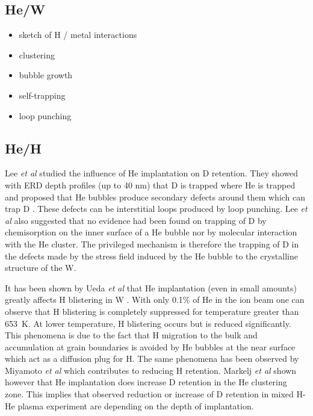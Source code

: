 \subsection{He/W}
\begin{itemize}
    \item sketch of H / metal interactions
    \item clustering
    \item bubble growth
    \item self-trapping
    \item loop punching
\end{itemize}


\subsection{He/H}
Lee \textit{et al} studied the influence of He implantation on D retention.
They showed with ERD depth profiles (up to 40 nm) that D is trapped where He is trapped and proposed that He bubbles produce secondary defects around them which can trap D \cite{lee_hydrogen_2007}.
These defects can be interstitial loops produced by loop punching.
Lee \textit{et al} also suggested that no evidence had been found on trapping of D by chemisorption on the inner surface of a He bubble nor by molecular interaction with the He cluster.
The privileged mechanism is therefore the trapping of D in the defects made by the stress field induced by the He bubble to the crystalline structure of the W.

It has been shown by Ueda \textit{et al} that He implantation (even in small amounts) greatly affects H blistering in W \cite{ueda_simultaneous_2009}.
With only 0.1\% of He in the ion beam one can observe that H blistering is completely suppressed for temperature greater than \SI{653}{K}.
At lower temperature, H blistering occurs but is reduced significantly.
This phenomena is due to the fact that H migration to the bulk and accumulation at grain boundaries is avoided by He bubbles at the near surface which act as a diffusion plug for H.
The same phenomena has been observed by Miyamoto \textit{et al} \cite{miyamoto_microscopic_2011} which contributes to reducing H retention.
Markelj \textit{et al} \cite{markelj_hydrogen_2017} shown however that He implantation does increase D retention in the He clustering zone.
This implies that observed reduction or increase of D retention in mixed H-He plasma experiment are depending on the depth of implantation.

